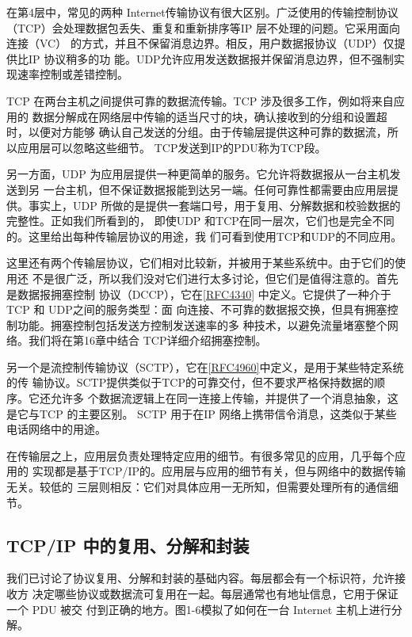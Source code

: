 在第4层中，常见的两种 Internet传输协议有很大区别。广泛使用的传输控制协议
（TCP）会处理数据包丢失、重复和重新排序等IP 层不处理的问题。它采用面向连接（VC）
的方式，并且不保留消息边界。相反，用户数据报协议（UDP）仅提供比IP 协议稍多的功
能。UDP允许应用发送数据报并保留消息边界，但不强制实现速率控制或差错控制。

TCP 在两台主机之间提供可靠的数据流传输。TCP 涉及很多工作，例如将来自应用的
数据分解成在网络层中传输的适当尺寸的块，确认接收到的分组和设置超时，以便对方能够
确认自己发送的分组。由于传输层提供这种可靠的数据流，所以应用层可以忽略这些细节。
TCP发送到IP的PDU称为TCP段。

另一方面，UDP 为应用层提供一种更简单的服务。它允许将数据报从一台主机发送到另
一台主机，但不保证数据报能到达另一端。任何可靠性都需要由应用层提供。事实上，UDP
所做的是提供一套端口号，用于复用、分解数据和校验数据的完整性。正如我们所看到的，
即使UDP 和TCP在同一层次，它们也是完全不同的。这里给出每种传输层协议的用途，我
们可看到使用TCP和UDP的不同应用。

这里还有两个传输层协议，它们相对比较新，并被用于某些系统中。由于它们的使用还
不是很广泛，所以我们没对它们进行太多讨论，但它们是值得注意的。首先是数据报拥塞控制
协议（DCCP），它在\href{https://www.rfc-editor.org/rfc/rfc4340}{[RFC4340]} 中定义。它提供了一种介于TCP 和 UDP之间的服务类型：面
向连接、不可靠的数据报交换，但具有拥塞控制功能。拥塞控制包括发送方控制发送速率的多
种技术，以避免流量堵塞整个网络。我们将在第16章中结合 TCP详细介绍拥塞控制。

另一个是流控制传输协议（SCTP），它在\href{https://www.rfc-editor.org/rfc/rfc4960}{[RFC4960]}中定义，是用于某些特定系统的传
输协议。SCTP提供类似于TCP的可靠交付，但不要求严格保持数据的顺序。它还允许多
个数据流逻辑上在同一连接上传输，并提供了一个消息抽象，这是它与TCP 的主要区别。
SCTP 用于在IP 网络上携带信令消息，这类似于某些电话网络中的用途。

在传输层之上，应用层负责处理特定应用的细节。有很多常见的应用，几乎每个应用的
实现都是基于TCP/IP的。应用层与应用的细节有关，但与网络中的数据传输无关。较低的
三层则相反：它们对具体应用一无所知，但需要处理所有的通信细节。

\subsection{TCP/IP 中的复用、分解和封装}
我们已讨论了协议复用、分解和封装的基础内容。每层都会有一个标识符，允许接收方
决定哪些协议或数据流可复用在一起。每层通常也有地址信息，它用于保证一个 PDU 被交
付到正确的地方。图1-6模拟了如何在一台 Internet 主机上进行分解。


